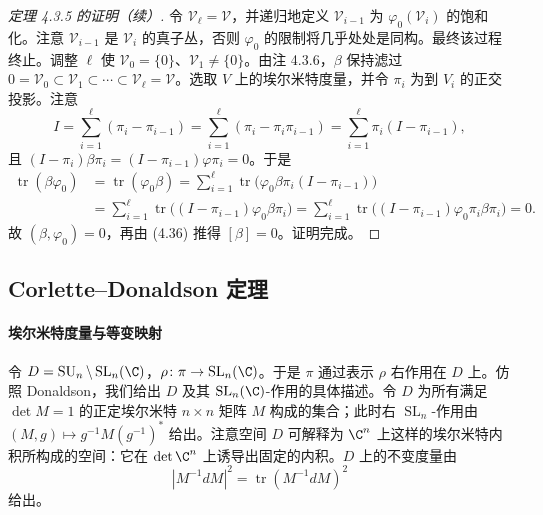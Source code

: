 \setcounter{theorem}{8}

\begin{proof}[定理 4.3.5 的证明（续）]
令 $\mathcal{V}_\ell=\mathcal{V}$，并递归地定义 $\mathcal{V}_{i-1}$ 为 $\varphi_0(\mathcal{V}_i)$ 的饱和化。注意 $\mathcal{V}_{i-1}$ 是 $\mathcal{V}_i$ 的真子丛，否则 $\varphi_0$ 的限制将几乎处处是同构。最终该过程终止。调整 $\ell$ 使 $\mathcal{V}_0=\{0\}$、$\mathcal{V}_1\neq\{0\}$。由注 4.3.6，$\beta$ 保持滤过 $0=\mathcal{V}_0\subset\mathcal{V}_1\subset\cdots\subset\mathcal{V}_\ell=\mathcal{V}$。选取 $V$ 上的埃尔米特度量，并令 $\pi_i$ 为到 $V_i$ 的正交投影。注意
\[
I=\sum_{i=1}^{\ell}(\pi_i-\pi_{i-1})=\sum_{i=1}^{\ell}(\pi_i-\pi_i\pi_{i-1})=\sum_{i=1}^{\ell}\pi_i(I-\pi_{i-1}),
\]
且 $(I-\pi_i)\beta\pi_i=(I-\pi_{i-1})\varphi\pi_i=0$。于是
\[
\begin{aligned}
\operatorname{tr}(\beta\varphi_0)&=\operatorname{tr}(\varphi_0\beta)=\sum_{i=1}^{\ell}\operatorname{tr}\bigl(\varphi_0\beta\pi_i(I-\pi_{i-1})\bigr)\\
&=\sum_{i=1}^{\ell}\operatorname{tr}\bigl((I-\pi_{i-1})\varphi_0\beta\pi_i\bigr)=\sum_{i=1}^{\ell}\operatorname{tr}\bigl((I-\pi_{i-1})\varphi_0\pi_i\beta\pi_i\bigr)=0.
\end{aligned}
\]
故 $(\beta,\varphi_0)=0$，再由 (4.36) 推得 $[\beta]=0$。证明完成。
\end{proof}

\subsection{Corlette--Donaldson 定理}

\paragraph{埃尔米特度量与等变映射} 令 $D=\operatorname{SU}_n\backslash\operatorname{SL}_n(\C)$，$\rho\colon\pi\to\operatorname{SL}_n(\C)$。于是 $\pi$ 通过表示 $\rho$ 右作用在 $D$ 上。仿照 Donaldson，我们给出 $D$ 及其 $\operatorname{SL}_n(\C)$-作用的具体描述。令 $D$ 为所有满足 $\det M=1$ 的正定埃尔米特 $n\times n$ 矩阵 $M$ 构成的集合；此时右 $\operatorname{SL}_n$-作用由 $(M,g)\mapsto g^{-1}M(g^{-1})^*$ 给出。注意空间 $D$ 可解释为 $\C^n$ 上这样的埃尔米特内积所构成的空间：它在 $\det\C^n$ 上诱导出固定的内积。$D$ 上的不变度量由
\[
|M^{-1}dM|^2=\operatorname{tr}(M^{-1}dM)^2
\]
给出。

